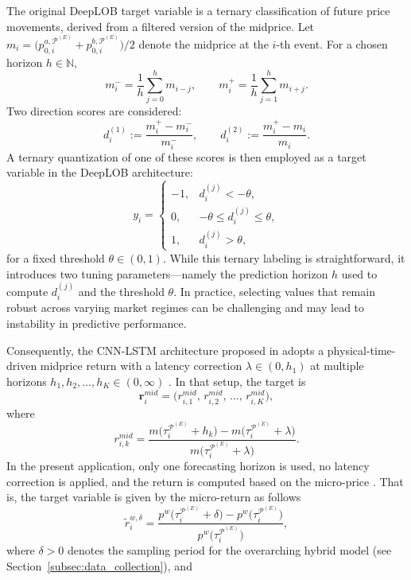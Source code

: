 \documentclass[10pt,a4paper,oneside]{article}
\providecommand{\DIFdelbegin}{} %
\providecommand{\DIFdelend}{} %
\newcommand{\DIFscaledelfig}{0.5}
\newlength{\DIFdelgraphicswidth} %
\newlength{\DIFdelgraphicsheight} %
\newcommand{\DIFdelincludegraphics}[2][]{%
\sbox{\DIFdelgraphicsbox}{\DIFOincludegraphics[#1]{#2}}%
\settoboxwidth{\DIFdelgraphicswidth}{\DIFdelgraphicsbox} %
\settoboxtotalheight{\DIFdelgraphicsheight}{\DIFdelgraphicsbox} %
\scalebox{\DIFscaledelfig}{%
\parbox[b]{\DIFdelgraphicswidth}{\usebox{\DIFdelgraphicsbox}\\[-\baselineskip] \rule{\DIFdelgraphicswidth}{0em}}\llap{\resizebox{\DIFdelgraphicswidth}{\DIFdelgraphicsheight}{%
\setlength{\unitlength}{\DIFdelgraphicswidth}%
\begin{picture}(1,1)%
\thicklines\linethickness{2pt} %
{\color[rgb]{1,0,0}\put(0,0){\framebox(1,1){}}}%
{\color[rgb]{1,0,0}\put(0,0){\line( 1,1){1}}}%
{\color[rgb]{1,0,0}\put(0,1){\line(1,-1){1}}}%
\end{picture}%
}\hspace*{3pt}}} %
} %
\DeclareRobustCommand{\DIFdelbegin}{\DIFOdelbegin \let\includegraphics\DIFdelincludegraphics} %
\DeclareRobustCommand{\DIFdelend}{\DIFOaddend \let\includegraphics\DIFOincludegraphics} %
\begin{document}
The original DeepLOB target variable is a ternary classification of future price movements, derived from a filtered version of the midprice. Let $m_i = \bigl(p^{a, \mathcal{P}^{(E)}}_{0,i} + p^{b, \mathcal{P}^{(E)}}_{0,i}\bigr) / 2$ denote the midprice at the $i$-th event. For a chosen horizon $h \in \mathbb{N}$,
\[
    m_i^- = \frac{1}{h}\sum_{j=0}^{h} m_{i-j},
    \quad\quad
    m_i^+ = \frac{1}{h}\sum_{j=1}^{h} m_{i+j}.
\]
Two direction scores are considered:
\[
    d_i^{(1)} := \frac{m_i^+ - m_i^-}{m_i^-},
    \quad\quad
    d_i^{(2)} := \frac{m_i^+ - m_i}{m_i}.
\]
A ternary quantization of one of these scores is then employed as a target variable in the DeepLOB architecture:
\[
    y_i =
    \begin{cases}
        -1, & d_i^{(j)} < -\theta,              \\[6pt]
        0,  & -\theta \le d_i^{(j)} \le \theta, \\[6pt]
        1,  & d_i^{(j)} > \theta,
    \end{cases}
\]
for a fixed threshold \(\theta \in (0, 1)\). While this ternary labeling is straightforward, it introduces two tuning parameters—namely the prediction horizon \(h\) used to compute \(d_i^{(j)}\) and the threshold \(\theta\). In practice, selecting values that remain robust across varying market regimes can be challenging and may lead to instability in predictive performance. \DIFdelbegin %

\DIFdelend Consequently, the CNN-LSTM architecture proposed in \cite{kolm2023deep} adopts a physical-time-driven midprice return with a latency correction \(\lambda \in (0, h_1)\) at multiple horizons \(h_1, h_2, \dots, h_K \in (0, \infty)\) . In that setup, the target is
\[
    \mathbf{r}^{mid}_i
    =
    \bigl(r^{mid}_{i, 1},\, r^{mid}_{i, 2},\, \dots,\, r^{mid}_{i, K}\bigr),
\]
where
\[
    r^{mid}_{i, k}
    =
    \frac{m\bigl(\tau^{\mathcal{P}^{(E)}}_i + h_k\bigr)
        - m\bigl(\tau^{\mathcal{P}^{(E)}}_i + \lambda\bigr)}{m\bigl(\tau^{\mathcal{P}^{(E)}}_i + \lambda\bigr)}.
\]
In the present application, only one forecasting horizon is used, no latency correction is applied, and the return is computed based on the micro-price \cite{gatheral2010zero}. That is, the target variable is given by the micro-return as follows
\begin{equation}
    \tilde{r}^{w, \delta}_{i}
    =
    \frac{p^w\bigl(\tau^{\mathcal{P}^{(E)}}_i + \delta\bigr) - p^w\bigl(\tau^{\mathcal{P}^{(E)}}_i\bigr)}{p^w\bigl(\tau^{\mathcal{P}^{(E)}}_i\bigr)},
    \label{eq:micro_ret_cnnlstm}
\end{equation}
where $\delta > 0$ denotes the sampling period for the overarching hybrid model (see Section~\ref{subsec:data_collection}), and
\DIFdelbegin %
\end{document}
